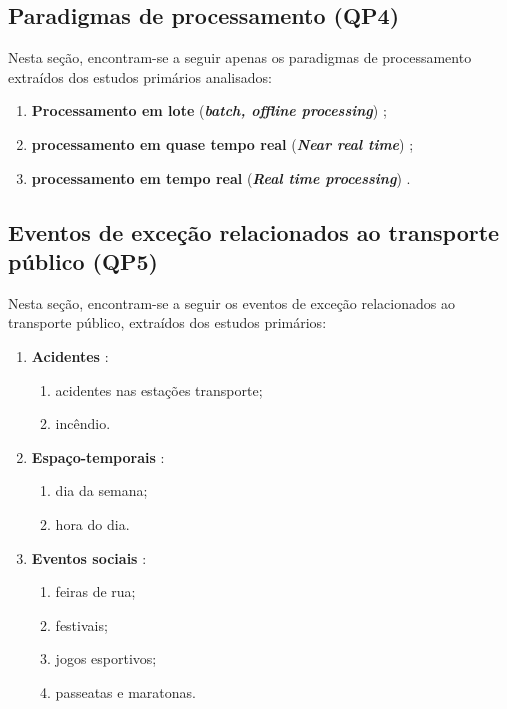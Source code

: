 \documentclass[
	12pt,				%
	oneside,			%
	a4paper,			%
	english,			%
	brazil				%
	]{abntex2ppgsi}
\begin{document}
{{{\subsection{Paradigmas de processamento (QP4)}
Nesta seção, encontram-se a seguir apenas os paradigmas de processamento extraídos dos estudos primários analisados: 
\begin{enumerate}
\item \textbf{Processamento em lote} (\textit{\textbf{batch, offline processing}}) \cite{Anantharam2015, Wen2016, Farseev2015, Gutev2016, Mata2015, Chen2016, Abbasi2015, Bendler2014, Yousaf2014, Frias-Martinez2014, Steiger2015Census, Gal-Tzur2014, Gkiotsalitis2016, DiLorenzo2013, Itoh2016, Chaniotakis2015};
\item \textbf{processamento em quase tempo real} (\textit{\textbf{Near real time}}) \cite{Mukherjee2015};
\item \textbf{processamento em tempo real} (\textit{\textbf{Real time processing}}) \cite{Soomro2016, Lecue2014}.
\end{enumerate}

\subsection{Eventos de exceção relacionados ao transporte público (QP5)}
\label{qp5}

Nesta seção, encontram-se a seguir os eventos de exceção relacionados ao transporte público, extraídos dos estudos primários:

\begin{enumerate}
\item \textbf{Acidentes} \cite{Itoh2016}:
\begin{enumerate}
\item acidentes nas estações transporte;
\item incêndio.
\end{enumerate}

\item \textbf{Espaço-temporais}  \cite{Chen2016}:
\begin{enumerate}
\item dia da semana;
\item hora do dia.
\end{enumerate}

\item \textbf{Eventos sociais} \cite{Chen2016, Lecue2014, Gal-Tzur2014, Itoh2016}:
\begin{enumerate}
\item feiras de rua;
\item festivais;
\item jogos esportivos;
\item passeatas e maratonas.
\end{enumerate}


\end{enumerate}}}}
\end{document}
